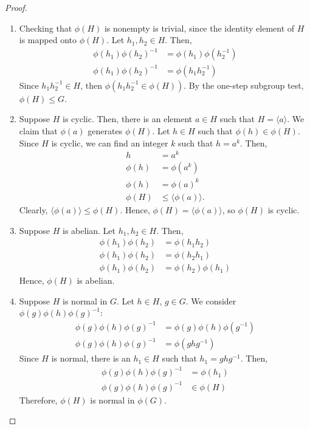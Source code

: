     \begin{proof}
        \mbox{}

        \begin{enumerate}
            \item Checking that \(\phi(H)\) is nonempty is trivial, since the identity element of \(H\) is mapped onto \(\phi(H)\). Let \(h_1, h_2 \in H\). Then,
            \begin{align*}
                \phi(h_1)\phi(h_2)^{-1} &= \phi(h_1)\phi(h_2^{-1}) \\
                \phi(h_1)\phi(h_2)^{-1} &= \phi(h_1h_2^{-1})
            \end{align*}
            Since \(h_1h_2^{-1} \in H\), then \(\phi(h_1h_2^{-1} \in \phi(H))\). By the one-step subgroup test, \(\phi(H) \leq G\).

            \item Suppose \(H\) is cyclic. Then, there is an element \(a\in H\) such that \(H = \langle a \rangle\). We claim that \(\phi(a)\) generates \(\phi(H)\). Let \(h\in H\) such that \(\phi(h) \in \phi(H)\). Since \(H\) is cyclic, we can find an integer \(k\) such that \(h = a^k\). Then,
            \begin{align*}
                h &= a^k \\
                \phi(h) &= \phi(a^k) \\
                \phi(h) &= \phi(a)^k \\
                \phi(H) &\leq \langle \phi(a)\rangle.
            \end{align*}
            Clearly, \(\langle \phi(a)\rangle \leq \phi(H)\). Hence, \(\phi(H) = \langle \phi(a)\rangle\), so \(\phi(H)\) is cyclic.

            \item Suppose \(H\) is abelian. Let \(h_1, h_2\in H\). Then,
            \begin{align*}
                \phi(h_1)\phi(h_2) &= \phi(h_1h_2) \\
                \phi(h_1)\phi(h_2) &= \phi(h_2h_1) \\
                \phi(h_1)\phi(h_2) &= \phi(h_2)\phi(h_1)
            \end{align*}
            Hence, \(\phi(H)\) is abelian.

            \item Suppose \(H\) is normal in \(G\). Let \(h\in H\), \(g\in G\). We consider \(\phi(g)\phi(h)\phi(g)^{-1}\):
            \begin{align*}
                \phi(g)\phi(h)\phi(g)^{-1} &= \phi(g)\phi(h)\phi(g^{-1}) \\
                \phi(g)\phi(h)\phi(g)^{-1} &= \phi(ghg^{-1})
            \end{align*}
            Since \(H\) is normal, there is an \(h_1\in H\) such that \(h_1 = ghg^{-1}\). Then,
            \begin{align*}
                \phi(g)\phi(h)\phi(g)^{-1} &= \phi(h_1) \\
                \phi(g)\phi(h)\phi(g)^{-1} &\in \phi(H)
            \end{align*}
            Therefore, \(\phi(H)\) is normal in \(\phi(G)\).


\end{enumerate}
\end{proof}
